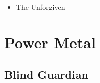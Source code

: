 \begin{minipage}[t]{0.25\textwidth}\vspace{0pt}
\begin{itemize}[nosep,leftmargin=1em,labelwidth=*,align=left]
	\setlength{\itemsep}{0pt}
	\item The Unforgiven
\end{itemize}
\end{minipage}


\section{Power Metal}

\subsection{Blind Guardian}

